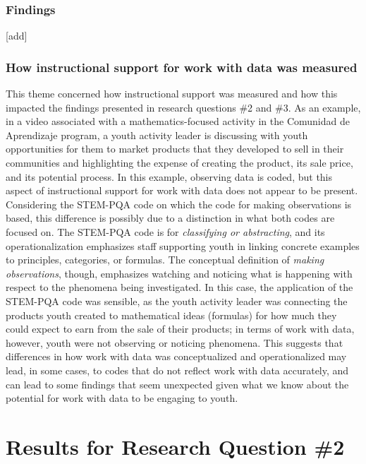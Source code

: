 \documentclass[]{book}
\theoremstyle{definition}
\theoremstyle{definition}
\theoremstyle{definition}
\theoremstyle{remark}
\begin{document}
\subsection{Findings}\label{findings}

{[}add{]}

\subsection{How instructional support for work with data was
measured}\label{how-instructional-support-for-work-with-data-was-measured}

This theme concerned how instructional support was measured and how this
impacted the findings presented in research questions \#2 and \#3. As an
example, in a video associated with a mathematics-focused activity in
the Comunidad de Aprendizaje program, a youth activity leader is
discussing with youth opportunities for them to market products that
they developed to sell in their communities and highlighting the expense
of creating the product, its sale price, and its potential process. In
this example, observing data is coded, but this aspect of instructional
support for work with data does not appear to be present. Considering
the STEM-PQA code on which the code for making observations is based,
this difference is possibly due to a distinction in what both codes are
focused on. The STEM-PQA code is for \emph{classifying or abstracting},
and its operationalization emphasizes staff supporting youth in linking
concrete examples to principles, categories, or formulas. The conceptual
definition of \emph{making observations}, though, emphasizes watching
and noticing what is happening with respect to the phenomena being
investigated. In this case, the application of the STEM-PQA code was
sensible, as the youth activity leader was connecting the products youth
created to mathematical ideas (formulas) for how much they could expect
to earn from the sale of their products; in terms of work with data,
however, youth were not observing or noticing phenomena. This suggests
that differences in how work with data was conceptualized and
operationalized may lead, in some cases, to codes that do not reflect
work with data accurately, and can lead to some findings that seem
unexpected given what we know about the potential for work with data to
be engaging to youth.

\chapter{Results for Research Question
\#2}\label{results-for-research-question-2}
\end{document}
